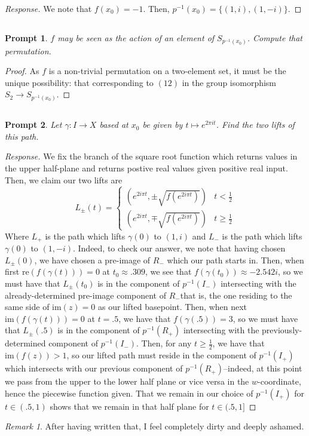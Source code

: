 \documentclass[english]{article}
\newcommand{\prt}[1]{\setcounter{subsection}{#1-1}\subsection{}}
\newtheorem*{prompt*}{Prompt}
\theoremstyle{remark}
\newtheorem{remark}{Remark}[section]
\theoremstyle{definition}
\newcommand{\im}{\mathrm{im}}
\newcommand{\re}{\mathrm{re}}
\begin{document}
\begin{proof}[Response]
We note that $f(x_0)=-1$. Then, $p^{-1}(x_0)=\{(1,i),(1,-i)\}$.
\end{proof}
\prt{5}\begin{prompt*}
	$f$ may be seen as the action of an element of $S_{p^{-1}(x_0)}$. Compute that permutation.
\end{prompt*}
\begin{proof}
	As $f$ is a non-trivial permutation on a two-element set, it must be the unique possibility: that corresponding to $(12)$ in the group isomorphism $S_2\to S_{p^{-1}(x_0)}$.
\end{proof}
\prt{6} \begin{prompt*}
Let $\gamma:I\to X$ based at $x_0$ be given by $t\mapsto e^{2\pi i t}$. Find the two lifts of this path.
\end{prompt*}
\begin{proof}[Response]
	We fix the branch of the square root function which returns values in the upper half-plane and returns postive real values given positive real input. Then, we claim our two lifts are
	\begin{equation*}
		L_\pm(t)=\begin{cases}
\left	(e^{2i\pi t}, \pm\sqrt{f(e^{2i\pi t})}\right) &t<\frac{1}{2}\\
\left	(e^{2i\pi t}, \mp\sqrt{f(e^{2i\pi t})}\right)&t\geq \frac{1}{2}
		\end{cases}
	\end{equation*}
Where $L_+$ is the path which lifts $\gamma(0)$ to $(1,i)$ and $L_-$ is the path which lifts $\gamma(0)$ to $(1,-i)$. Indeed, to check our answer, we note that having chosen $L_\pm(0)$, we have chosen a pre-image of $R_-$ which our path starts in. Then, when first $\re(f(\gamma(t)))=0$ at $t_0\approx .309$, we see that $f(\gamma(t_0))\approx -2.542i$, so we must have that $L_\pm(t_0)$ is in the component of $p^{-1}(I_-)$ intersecting with the already-determined pre-image component of $R_-$\textemdash that is, the one residing to the same side of $\im(z)=0$ as our lifted basepoint. Then, when next $\im(f(\gamma(t)))=0$ at $t=.5$, we have that $f(\gamma(.5))=3$, so we must have that $L_\pm(.5)$ is in the component of $p^{-1}(R_+)$ intersecting with the previously-determined component of $p^{-1}(I_-)$. Then, for any $t\geq \frac{1}{2}$, we have that $\im(f(z))>1$, so our lifted path must reside in the component of $p^{-1}(I_+)$ which intersects with our previous component of $p^{-1}(R_+)$--indeed, at this point we pass from the upper to the lower half plane or vice versa in the $w$-coordinate, hence the piecewise function given. That we remain in our choice of $p^{-1}(I_+)$ for $t\in(.5,1)$ shows that we remain in that half plane for $t\in (.5,1]$ \end{proof}\begin{remark}
	After having written that, I feel completely dirty and deeply ashamed.
\end{remark}
\end{document}
